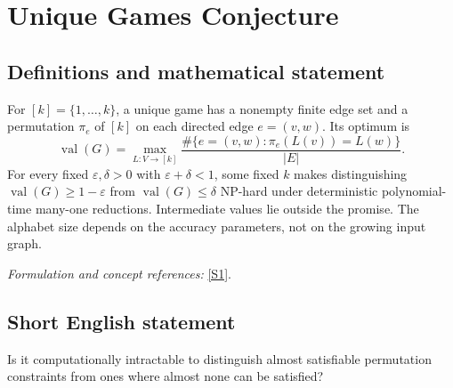\documentclass[11pt,a4paper]{article}
\newcommand{\sref}[2]{\hyperlink{source:#1:#2}{[S#2]}}
\newif\ifshowcatalogue
\newcommand{\cataloguescope}[1]{\ifshowcatalogue
 \paragraph{Exact scope in the supplied catalogue.}
 \begin{quote}\small #1\end{quote}\fi}
\numberwithin{equation}{section}
\begin{document}
\setcounter{section}{28}
\clearpage
\section{\texorpdfstring{Unique Games Conjecture}{Unique Games Conjecture}}\label{29}
\subsection{Definitions and mathematical statement}
For $[k]=\{1,\ldots,k\}$, a unique game has a nonempty finite edge set and a permutation $\pi_e$ of $[k]$ on each directed edge $e=(v,w)$. Its optimum is
\[
 \operatorname{val}(G)=\max_{L:V\to[k]}\frac{\#\{e=(v,w):\pi_e(L(v))=L(w)\}}{|E|}.
\]
For every fixed $\varepsilon,\delta>0$ with $\varepsilon+\delta<1$, some fixed $k$ makes distinguishing $\operatorname{val}(G)\ge1-\varepsilon$ from $\operatorname{val}(G)\le\delta$ NP-hard under deterministic polynomial-time many-one reductions. Intermediate values lie outside the promise. The alphabet size depends on the accuracy parameters, not on the growing input graph.
\par\smallskip\textit{Formulation and concept references:} \sref{29}{1}.
\cataloguescope{For every fixed pair of real constants epsilon, delta > 0 with epsilon + delta < 1, there exists an integer k >= 2, depending only on epsilon and delta, such that the following promise problem is NP-hard under deterministic polynomial-time many-one reductions. An instance is a finite directed constraint graph G=(V,E) with E nonempty and, for each edge e=(v,w), a permutation pi\_e of [k]. For a labeling L:V->[k], an edge is satisfied if pi\_e(L(v))=L(w); val(G) is the largest fraction of satisfied edges over all labelings. Distinguish val(G) >= 1-epsilon from val(G) <= delta, with no requirement on instances between these thresholds. The graph is the growing input; epsilon, delta and k are fixed constants. NP-hardness means that every language in NP has such a reduction mapping yes inputs to the first promised set and no inputs to the second.}
\subsection{Short English statement}
Is it computationally intractable to distinguish almost satisfiable permutation constraints from ones where almost none can be satisfied?
\end{document}
